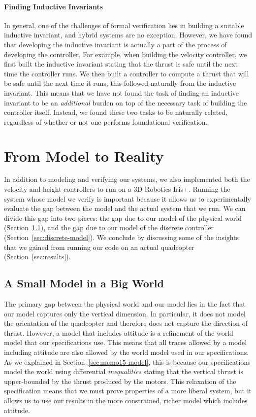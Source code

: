\paragraph*{Finding Inductive Invariants}
In general, one of the challenges of formal verification lies in building a
suitable inductive invariant, and hybrid systems are no exception.
However, we have found that developing the inductive invariant is actually
a part of the process of developing the controller.  For example, when
building the velocity controller, we first built the inductive invariant
stating that the thrust is safe until the next time the controller runs.
We then built a controller to compute a thrust that will be safe until the
next time it runs; this followed naturally from the inductive invariant.
This means that we have not found the task of finding an inductive
invariant to be an \emph{additional} burden on top of the necessary task of
building the controller itself. Instead, we found these two tasks to be
naturally related, regardless of whether or not one performs foundational
verification.

\section{From Model to Reality}
\label{sec:experiences}
In addition to modeling and verifying our systems, we also implemented both
the velocity and height controllers to run on a 3D Robotics Iris+.  Running
the system whose model we verify is important because it allows us to
experimentally evaluate the gap between the model and the actual system
that we run.  We can divide this gap into two pieces: the gap due to our
model of the physical world (Section~\ref{sec:world-model}), and the gap
due to our model of the discrete controller
(Section~\ref{sec:discrete-model}).  We conclude by discussing some of the
insights that we gained from running our code on an actual quadcopter
(Section~\ref{sec:results}).

\subsection{A Small Model in a Big World}
\label{sec:world-model}

The primary gap between the physical world and our model lies in the fact
that our model captures only the vertical dimension.  In particular, it
does not model the orientation of the quadcopter and therefore does not
capture the direction of thrust.  However, a model that includes attitude
is a refinement of the world model that our specifications use.  This means
that all traces allowed by a model including attitude are also allowed by
the world model used in our specifications.  As we explained in
Section~\ref{sec:memo15-model}, this is because our specifications model
the world using differential \emph{inequalities} stating that the vertical
thrust is upper-bounded by the thrust produced by the motors.  This
relaxation of the specification means that we must prove properties of a
more liberal system, but it allows us to use our results in the more
constrained, richer model which includes attitude.


